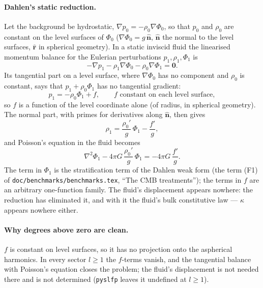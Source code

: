 \documentclass[11pt]{article}
\numberwithin{equation}{section}
\newcommand{\vn}{\hat{\mathbf{n}}}
\newcommand{\rhat}{\hat{\mathbf{r}}}
\newcommand{\code}[1]{\texttt{#1}}
\begin{document}
\paragraph{Dahlen's static reduction.} Let the background be hydrostatic,
$\nabla p_0 = -\rho_0\nabla\Phi_0$, so that $p_0$ and $\rho_0$ are constant
on the level surfaces of $\Phi_0$ ($\nabla\Phi_0 = g\,\vn$, $\vn$ the normal
to the level surfaces, $\rhat$ in spherical geometry). In a static inviscid
fluid the linearised momentum balance for the Eulerian perturbations
$p_1,\rho_1,\Phi_1$ is
\begin{equation}
  -\nabla p_1 - \rho_1\nabla\Phi_0 - \rho_0\nabla\Phi_1 = \mathbf 0 .
  \label{eq:fluid-balance}
\end{equation}
Its tangential part on a level surface, where $\nabla\Phi_0$ has no
component and $\rho_0$ is constant, says that $p_1+\rho_0\Phi_1$ has no
tangential gradient:
\begin{equation}
  p_1 = -\rho_0\Phi_1 + f, \qquad f \text{ constant on each level surface},
  \label{eq:dahlen-p}
\end{equation}
so $f$ is a function of the level coordinate alone (of radius, in
spherical geometry). The normal part, with primes for derivatives along
$\vn$, then gives
\begin{equation}
  \rho_1 = \frac{\rho_0'}{g}\,\Phi_1 - \frac{f'}{g},
  \label{eq:dahlen-rho}
\end{equation}
and Poisson's equation in the fluid becomes
\begin{equation}
  \nabla^2\Phi_1 - 4\pi G\,\frac{\rho_0'}{g}\,\Phi_1 = -4\pi G\,\frac{f'}{g}.
  \label{eq:dahlen-poisson}
\end{equation}
The term in $\Phi_1$ is the stratification term of the Dahlen weak form
(the term (F1) of \code{doc/benchmarks/benchmarks.tex}, ``The CMB treatments''); the
terms in $f$ are an arbitrary one-function family. The fluid's displacement
appears nowhere: the reduction has eliminated it, and with it the fluid's
bulk constitutive law --- $\kappa$ appears nowhere either.

\paragraph{Why degrees above zero are clean.} $f$ is constant on level
surfaces, so it has no projection onto the aspherical harmonics. In every
sector $l\ge1$ the $f$-terms vanish, and the tangential balance with
Poisson's equation closes the problem; the fluid's displacement is not
needed there and is not determined (\code{pyslfp} leaves it undefined at
$l\ge1$).
\end{document}
